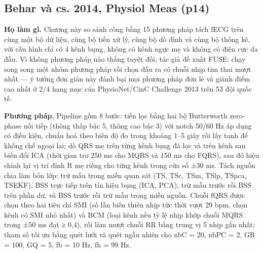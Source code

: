 \documentclass[12pt,a4paper]{article}
\begin{document}
\subsection{Behar và cs. 2014, Physiol Meas \normalfont\small (p14)}
\par\vspace{2pt}
\par\vspace{4pt}
\noindent \textbf{Họ làm gì.} Chương này so sánh công bằng 15 phương pháp tách fECG trên cùng một bộ dữ liệu, cùng bộ tiền xử lý, cùng bộ dò đỉnh và cùng bộ thống kê, với cấu hình chỉ có 4 kênh bụng, không có kênh ngực mẹ và không có điện cực da đầu. Vì không phương pháp nào thắng tuyệt đối, tác giả đề xuất FUSE: chạy song song một nhóm phương pháp rồi chọn đầu ra có chuỗi nhịp tim thai mượt nhất — ý tưởng đơn giản này đánh bại mọi phương pháp đơn lẻ và giành điểm cao nhất ở 2/4 hạng mục của PhysioNet/CinC Challenge 2013 trên 53 đội quốc tế.\par\vspace{3pt}
\noindent \textbf{Phương pháp.} Pipeline gồm 8 bước: tiền lọc bằng hai bộ Butterworth zero-phase nối tiếp (thông thấp bậc 5, thông cao bậc 3) với notch 50/60 Hz áp dụng có điều kiện, chuẩn hoá theo biên độ đo trong khoảng 1–5 giây rồi lấy tanh để khống chế ngoại lai; dò QRS mẹ trên từng kênh bụng đã lọc và trên kênh sau biến đổi ICA (thời gian trơ 250 ms cho MQRS và 150 ms cho FQRS), sau đó hiệu chỉnh lại vị trí đỉnh R mẹ riêng cho từng kênh trong cửa sổ ±30 ms. Tách nguồn chia làm bốn lớp: trừ mẫu trong miền quan sát (TS, TSc, TSm, TSlp, TSpca, TSEKF), BSS trực tiếp trên tín hiệu bụng (ICA, PCA), trừ mẫu trước rồi BSS trên phần dư, và BSS trước rồi trừ mẫu trong miền nguồn. Chuỗi fQRS được chọn theo hai tiêu chí SMI (số lần biến thiên nhịp tức thời vượt 29 bpm, chọn kênh có SMI nhỏ nhất) và BCM (loại kênh nếu tỷ lệ nhịp khớp chuỗi MQRS trong ±50 ms đạt ≥ 0,4), rồi làm mượt chuỗi RR bằng trung vị 5 nhịp gần nhất; tham số tối ưu bằng quét lưới và quét ngẫu nhiên cho nbC = 20, nbPC = 2, GR = 100, GQ = 5, fb = 10 Hz, fh = 99 Hz.\par\vspace{3pt}
\end{document}
